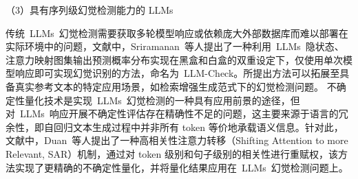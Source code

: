 （3）{具有序列级幻觉检测能力的 LLMs}

传统~LLMs~幻觉检测需要获取多轮模型响应或依赖庞大外部数据库而难以部署在实际环境中的问题，文献\cite{20251218102787}中，Sriramanan~等人提出了一种利用~LLMs~隐状态、注意力映射图集输出预测概率分布实现在黑盒和白盒的双重设定下，仅使用单次模型响应即可实现幻觉识别的方法，命名为~LLM-Check。所提出方法可以拓展至具备真实参考文本的特定应用场景，如检索增强生成范式下的幻觉检测问题。
% 
不确定性量化技术是实现~LLMs~幻觉检测的一种具有应用前景的途径，但对~LLMs~响应开展不确定性评估存在精确性不足的问题，这主要来源于语言的冗余性，即自回归文本生成过程中并非所有 token 等价地承载语义信息。针对此，文献\cite{20243917091282}中，Duan~等人提出了一种高相关性注意力转移（Shifting Attention to more Relevant, SAR）机制，通过对 token 级别和句子级别的相关性进行重赋权，该方法实现了更精确的不确定性量化，并将量化结果应用在~LLMs~幻觉检测问题上。
